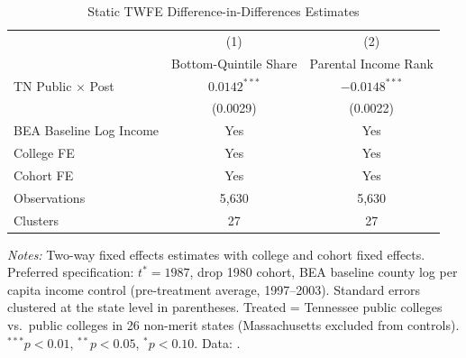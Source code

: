 \begin{table}[H]
\centering
\begin{threeparttable}
\caption{Static TWFE Difference-in-Differences Estimates}
\label{tab:twfe_did}
\begin{tabular}{lcc}
\toprule
 & (1) & (2) \\
 & Bottom-Quintile Share & Parental Income Rank \\
\midrule
TN Public $\times$ Post & $0.0142^{***}$ & $-0.0148^{***}$ \\
                         & (0.0029) & (0.0022) \\
\addlinespace
BEA Baseline Log Income  & Yes & Yes \\
College FE               & Yes & Yes \\
Cohort FE                & Yes & Yes \\
\midrule
Observations             & 5,630 & 5,630 \\
Clusters                 & 27 & 27 \\
\bottomrule
\end{tabular}
\begin{tablenotes}[flushleft]
\footnotesize
\item \textit{Notes:} Two-way fixed effects estimates with college and
  cohort fixed effects. Preferred specification: $t^* = 1987$, drop
  1980 cohort, BEA baseline county log per capita income control
  (pre-treatment average, 1997--2003). Standard errors clustered at the
  state level in parentheses. Treated = Tennessee public colleges vs.\
  public colleges in 26 non-merit states (Massachusetts excluded from
  controls). $^{***}p<0.01$, $^{**}p<0.05$, $^{*}p<0.10$.
  Data: \textcite{chetty2020mobility}.
\end{tablenotes}
\end{threeparttable}
\end{table}
